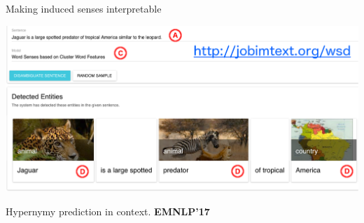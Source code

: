 \begin{frame}{ Making induced senses interpretable }

\vspace{-1em}
	\begin{center}
	\includegraphics[width=1.05\textwidth]{figures/emnlp_all}
	
	{\footnotesize Hypernymy prediction in context. \textbf{EMNLP'17}~\cite{panchenko-EtAl:2017:EMNLP2017Demos}}
	\end{center}	
	
	

	
\end{frame}


%
%	
%	
%	
%
%	
%
%
%
%
%	
%
